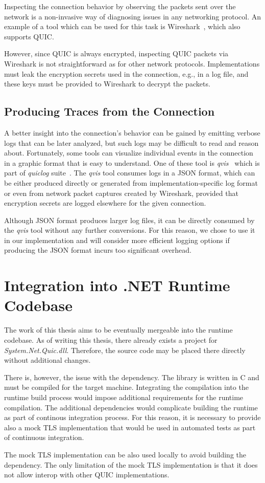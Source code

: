 Inspecting the connection behavior by observing the packets sent over the network is a non-invasive
way of diagnosing issues in any networking protocol. An example of a tool which can be used for this
task is Wireshark~\cite{web:wireshark}, which also supports QUIC.

However, since QUIC is always encrypted, inspecting QUIC packets via Wireshark is not
straightforward as for other network protocols. Implementations must leak the encryption secrets
used in the connection, e.g., in a log file, and these keys must be provided to Wireshark to decrypt
the packets.

\subsection{Producing Traces from the Connection}

A better insight into the connection's behavior can be gained by emitting verbose logs that can be
later analyzed, but such logs may be difficult to read and reason about. Fortunately, some tools can
visualize individual events in the connection in a graphic format that is easy to understand. One of
these tool is \textit{qvis}~\cite{web:qvis} which is part of \textit{quiclog}
suite~\cite{githubquiclog}. The \textit{qvis} tool consumes logs in a JSON format, which can be
either produced directly or generated from implementation-specific log format or even from network
packet captures created by Wireshark, provided that encryption secrets are logged elsewhere for the
given connection.

Although JSON format produces larger log files, it can be directly consumed by the \textit{qvis}
tool without any further conversions. For this reason, we chose to use it in our implementation and
will consider more efficient logging options if producing the JSON format incurs too significant
overhead.

\section{Integration into .NET Runtime Codebase}

The work of this thesis aims to be eventually mergeable into the \dotnet{} runtime codebase. As of
writing this thesis, there already exists a project for \textit{System.Net.Quic.dll}. Therefore, the
source code may be placed there directly without additional changes.

There is, however, the issue with the \libopenssl{} dependency. The \libopenssl{} library is written
in C and must be compiled for the target machine. Integrating the \libopenssl{} compilation into the
\dotnet{} runtime build process would impose additional requirements for the \dotnet{} runtime
compilation. The additional dependencies would complicate building the \dotnet{} runtime as part of
continous integration process. For this reason, it is necessary to provide also a mock TLS
implementation that would be used in automated tests as part of continuous integration.

The mock TLS implementation can be also used locally to avoid building the \libopenssl{} dependency.
The only limitation of the mock TLS implementation is that it does not allow interop with other QUIC
implementations.
